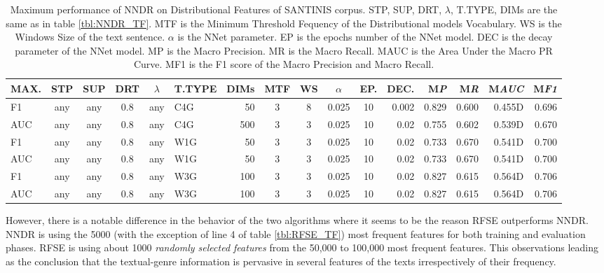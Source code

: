 \begin{table}
\center
\begin{tabular}{|l|cccc|lr|ccccr|rrrr|}
\hline
MAX. & STP & SUP & DRT & $\lambda$ & T.TYPE & DIMs & MTF & WS & $\alpha$ & EP. & DEC. & M\emph{P} & M\emph{R} & M\emph{AUC} & M\emph{F1} \\
\hline
F1 & any & any & 0.8 & any & C4G & 50 & 3 & 8 & 0.025 & 10 & 0.002 & 0.829 & 0.600 & 0.455D & 0.696 \\
AUC & any & any & 0.8 & any & C4G & 500 & 3 & 3 & 0.025 & 10 & 0.02 & 0.755 & 0.602 & 0.539D & 0.670 \\
F1 & any & any & 0.8 & any & W1G & 50 & 3 & 3 & 0.025 & 10 & 0.02 & 0.733 & 0.670 & 0.541D & 0.700 \\
AUC & any & any & 0.8 & any & W1G & 50 & 3 & 3 & 0.025 & 10 & 0.02 & 0.733 & 0.670 & 0.541D & 0.700 \\
F1 & any & any & 0.8 & any & W3G & 100 & 3 & 3 & 0.025 & 10 & 0.02 & 0.827 & 0.615 & 0.564D & 0.706 \\
AUC & any & any & 0.8 & any & W3G & 100 & 3 & 3 & 0.025 & 10 & 0.02 & 0.827 & 0.615 & 0.564D & 0.706 \\
\hline
\end{tabular}
\caption {Maximum performance of NNDR on Distributional Features of SANTINIS corpus. STP, SUP, DRT, $\lambda$, T.TYPE, DIMs are the same as in table \ref{tbl:NNDR_TF}. MTF is the Minimum Threshold Fequency of the Distributional models Vocabulary. WS is the Windows Size of the text sentence. $\alpha$ is the NNet parameter. EP is the epochs number of the NNet model. DEC is the decay parameter of the NNet model. MP is the Macro Precision. MR is the Macro Recall. MAUC is the Area Under the Macro PR Curve. MF1 is the F1 score of the Macro Precision and Macro Recall.}
\label{tbl:NNDR_Gensim}
\vspace{-20mm}
\end{table}

\pagebreak


However, there is a notable difference in the behavior of the two algorithms where it seems to be the reason RFSE outperforms NNDR. NNDR is using the 5000 (with the exception of line 4 of table \ref{tbl:RFSE_TF}) most frequent features for both training and evaluation phases. RFSE is using about 1000 \textit{randomly selected features} from the 50,000 to 100,000 most frequent features. This observations leading as the conclusion that the textual-genre information is pervasive in several features of the texts irrespectively of their frequency.

